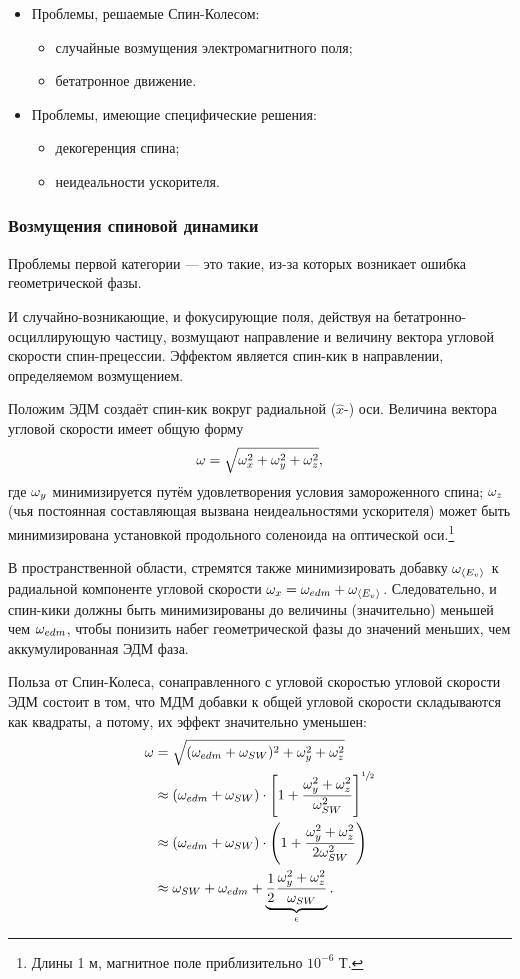 \begin{itemize}
	\item Проблемы, решаемые Спин-Колесом:
	\begin{itemize}
		\item случайные возмущения электромагнитного поля;
		\item бетатронное движение.
	\end{itemize}
	\item Проблемы, имеющие специфические решения:
	\begin{itemize}
		\item декогеренция спина;
		\item неидеальности ускорителя.
	\end{itemize}
\end{itemize}

\subsubsection{Возмущения спиновой динамики}
Проблемы первой категории --- это такие, из-за которых возникает ошибка геометрической фазы.

И случайно-возникающие, и фокусирующие поля, действуя на бетатронно-осциллирующую частицу,
возмущают направление и величину вектора угловой скорости спин-прецессии. Эффектом является
спин-кик в направлении, определяемом возмущением.

Положим ЭДМ создаёт спин-кик вокруг радиальной ($\hat x$-) оси. Величина вектора угловой скорости
имеет общую форму
\[
\omega = \sqrt{\omega_x^2 + \omega_y^2 + \omega_z^2},
\]
где  $\omega_y$ минимизируется путём удовлетворения условия замороженного спина; $\omega_z$ (чья постоянная
составляющая вызвана неидеальностями ускорителя) может быть минимизирована установкой продольного 
соленоида на оптической оси.\footnote{Длины 1 м, магнитное поле приблизительно $10^{-6}$ Т.}

В пространственной области, стремятся также минимизировать добавку $\wimp$ к радиальной компоненте
угловой скорости $\w_x = \w_{edm} + \wimp$. Следовательно, и спин-кики должны быть минимизированы до
величины (значительно) меньшей чем $\omega_{edm}$, чтобы понизить набег геометрической фазы до значений
меньших, чем аккумулированная ЭДМ фаза.

Польза от Спин-Колеса, сонаправленного с угловой скоростью угловой скорости ЭДМ состоит в том, что
МДМ добавки к общей угловой скорости складываются как квадраты, а потому, их эффект значительно уменьшен:
\begin{align*}
	\w &= \sqrt{(\wedm + \wsw)^2 + \w_y^2 + \w_z^2} \\
	&\approx (\wedm+\wsw)\cdot\bkt*{1 + \frac{\w_y^2 + \w_z^2}{\wsw^2}}^{\sfrac12} \\
	&\approx (\wedm + \wsw)\cdot \bkt{1 + \frac{\w_y^2 + \w_z^2}{2\wsw^2}} \\
	&\approx \wsw + \wedm + \underbrace{\frac12\frac{\w_y^2 + \w_z^2}{\wsw}}_{\epsilon}.
\end{align*}

